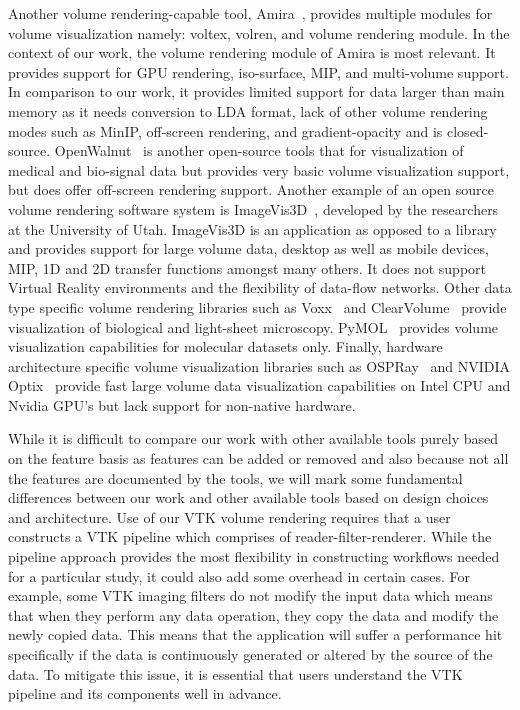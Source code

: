 Another volume rendering-capable tool, Amira~\citep{stalling2005amira}, provides multiple modules for volume visualization namely: voltex, volren, and volume rendering module. In the context of our work, the volume rendering module of Amira is most relevant. It provides support for GPU rendering, iso-surface, MIP, and multi-volume support. In comparison to our work, it provides limited support for data larger than main memory as it needs conversion to LDA format, lack of other volume rendering modes such as MinIP, off-screen rendering, and gradient-opacity and is closed-source. OpenWalnut~\citep{eichelbaum2010openwalnut}
is another open-source tools that for visualization of medical and bio-signal data but
provides very basic volume visualization support, but does offer off-screen rendering
support. Another example of an open source volume rendering software system is
ImageVis3D~\citep{cibc_imagevis3D:_2016}, developed by the researchers at the
University of Utah. ImageVis3D is an application as opposed to a library and
provides support for large volume data, desktop as well as mobile devices, MIP,
1D and 2D transfer functions amongst many others.  It does not support Virtual
Reality environments and the flexibility of data-flow networks. Other data
type specific volume rendering libraries such as
Voxx~\citep{clendenon_voxx:_2002} and
ClearVolume~\citep{royer_clearvolume:_2015} provide visualization of
biological and light-sheet microscopy.
PyMOL~\citep{schrodinger_llc_pymol_2015} provides volume visualization
capabilities for molecular datasets only. Finally, hardware architecture
specific volume visualization libraries such as
OSPRay~\citep{wald_ospray_2017} and NVIDIA\textsuperscript{\textregistered}
Optix\textsuperscript{\texttrademark}~\citep{parker_optix:_2010} provide fast
large volume data visualization capabilities on Intel CPU and Nvidia GPU's but
lack support for non-native hardware.

While it is difficult to compare our work with other available tools purely based on the feature basis as features can be added or removed and also because not all the features are documented by the tools, we will mark some fundamental differences between our work and other available tools based on design choices and architecture. Use of our VTK volume rendering requires that a user constructs a VTK pipeline which comprises of  reader-filter-renderer. While the pipeline approach provides the most flexibility in constructing workflows needed for a particular study, it could also add some overhead in certain cases. For example, some VTK imaging filters do not modify the input data which means that when they perform any data operation, they copy the data and modify the newly copied data. This means that the application will suffer a performance hit specifically if the data is continuously generated or altered by the source of the data. To mitigate this issue, it is essential that users understand the VTK pipeline and its components well in advance.


